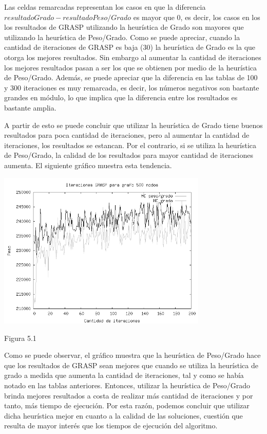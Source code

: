 \documentclass[a4paper,11pt] {article}
\begin{document}
Las celdas remarcadas representan los casos en que la diferencia \\ $resultadoGrado - resultadoPeso/Grado$ es mayor que 0, es decir, los casos en los los resultados de GRASP utilizando la heur\'istica de Grado son mayores que utilizando la heur\'istica de Peso/Grado. Como se puede apreciar, cuando la cantidad de iteraciones de GRASP es baja (30) la heur\'istica de Grado es la que otorga los mejores resultados. Sin embargo al aumentar la cantidad de iteraciones los mejores resultados pasan a ser los que se obtienen por medio de la heur\'istica de Peso/Grado. Adem\'as, se puede apreciar que la diferencia en las tablas de 100 y 300 iteraciones es muy remarcada, es decir, los n\'umeros negativos son bastante grandes en m\'odulo, lo que implica que la diferencia entre los resultados es bastante amplia. 

A partir de esto se puede concluir que utilizar la heur\'istica de Grado tiene buenos resultados para poca cantidad de iteraciones, pero al aumentar la cantidad de iteraciones, los resultados se estancan. Por el contrario, si se utiliza la heur\'istica de Peso/Grado, la calidad de los resultados para mayor cantidad de iteraciones aumenta. El siguiente gr\'afico muestra esta tendencia.

\begin{center}
 \includegraphics[width=0.75\textwidth]{graficos/pesosCantIter.png}
\begin{center}
Figura 5.1
\end{center}
\end{center}

Como se puede observar, el gr\'afico muestra que la heur\'istica de Peso/Grado hace que los resultados de GRASP sean mejores que cuando se utiliza la heur\'istica de grado a medida que aumenta la cantidad de iteraciones, tal y como se hab\'ia notado en las tablas anteriores. Entonces, utilizar la heur\'istica de Peso/Grado brinda mejores resultados a costa de realizar m\'as cantidad de iteraciones y por tanto, m\'as tiempo de ejecuci\'on. Por esta raz\'on, podemos concluir que utilizar dicha heur\'istica mejor en cuanto a la calidad de las soluciones, cuesti\'on que resulta de mayor inter\'es que los tiempos de ejecuci\'on del algoritmo.
\end{document}
